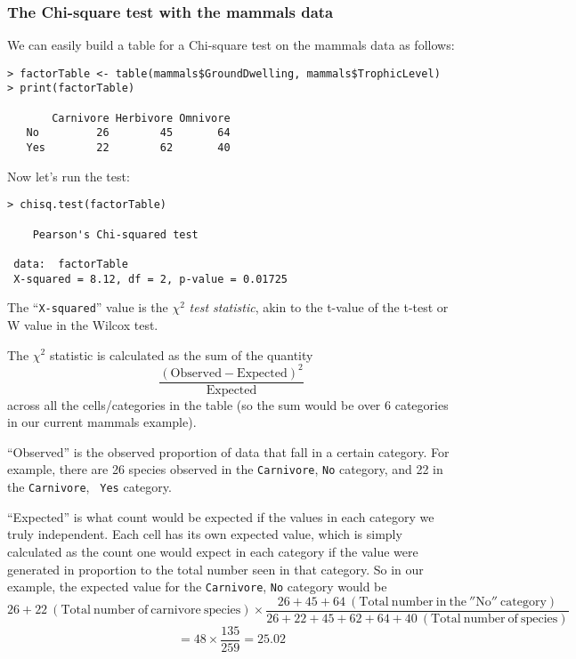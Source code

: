 \subsubsection{The Chi-square test with the mammals data}

We can easily build a table for a Chi-square test on the mammals 
data as follows:
  
\begin{lstlisting}
> factorTable <- table(mammals$GroundDwelling, mammals$TrophicLevel)
> print(factorTable) 

       Carnivore Herbivore Omnivore
   No         26        45       64
   Yes        22        62       40
\end{lstlisting}

Now let's run the test:

\begin{lstlisting}
> chisq.test(factorTable)
  
 	Pearson's Chi-squared test
 
 data:  factorTable 
 X-squared = 8.12, df = 2, p-value = 0.01725
\end{lstlisting}

The ``{\tt X-squared}'' value is the $\chi^{2}$ {\it test statistic}, akin to the 
t-value of the t-test or W value in the Wilcox test. 

The $\chi^{2}$ statistic is calculated as the sum of the quantity 
$$ \frac{(\mathrm{Observed} - \mathrm{Expected})^2}{\mathrm{Expected}} $$
across all the cells/categories in the table (so the sum would be over 
6 categories in our current mammals example).
   
``Observed'' is the observed proportion of data that fall in a 
certain category. For example, there are 26 species observed in the 
{\tt Carnivore}, {\tt No} category, and 22 in the {\tt Carnivore}, {\tt 
Yes} category. 

``Expected'' is what count would be expected if the values in each 
category we truly independent. Each cell has its own expected value, 
which is simply calculated as the count one would expect in each 
category if the value were generated in proportion to the total number 
seen in that category. So in our example, the expected value for the 
{\tt Carnivore}, {\tt No} category would be
$$26+22 \mathrm{~(Total~number~of~carnivore~species)} 
\times \frac{26+45+64 \mathrm{~(Total~number~in~the~''No''~category)}}{ 
26+22+45+62+64+40 \mathrm{~(Total~number~of~species)}}$$  
$$= 48 \times \frac{135}{259} = 25.02$$

